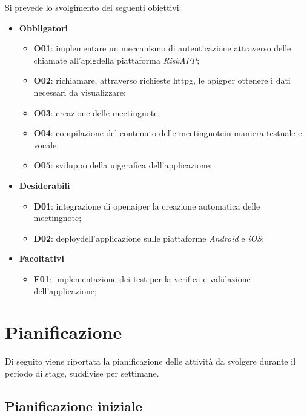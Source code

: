 Si prevede lo svolgimento dei seguenti obiettivi:
\begin{itemize}
    \item \textbf{Obbligatori}
    \begin{itemize}
        \item \textbf{O01}: implementare un meccanismo di autenticazione attraverso delle chiamate all'\gls{apig}\glsoccur della piattaforma \emph{RiskAPP};
        \item \textbf{O02}: richiamare, attraverso richieste \gls{httpg}\glsoccur, le \gls{apig}\glsoccur per ottenere i dati necessari da visualizzare;
        \item \textbf{O03}: creazione delle \gls{meetingnote}\glsoccur;
        \item \textbf{O04}: compilazione del contenuto delle \gls{meetingnote}\glsoccur in maniera testuale e vocale;
        \item \textbf{O05}: sviluppo della \gls{uig}\glsoccur grafica dell'applicazione;
    \end{itemize}
    \item \textbf{Desiderabili}
    \begin{itemize}
        \item \textbf{D01}: integrazione di \gls{openai}\glsoccur per la creazione automatica delle \gls{meetingnote}\glsoccur;
        \item \textbf{D02}: \gls{deploy}\glsoccur dell'applicazione sulle piattaforme \emph{Android} e \emph{iOS};
    \end{itemize}
    \item \textbf{Facoltativi}
    \begin{itemize}
        \item \textbf{F01}: implementazione dei test per la verifica e validazione dell'applicazione;
    \end{itemize}
\end{itemize}

\section{Pianificazione}
\label{sec:pianificazione}

Di seguito viene riportata la pianificazione delle attività da svolgere durante il periodo di stage, suddivise per settimane.\\

\subsection{Pianificazione iniziale}
\label{subsec:pianificazione-iniziale}

